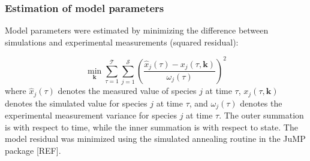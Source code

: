 \documentclass[10pt,twocolumn,twoside,final]{IEEEtran}
\begin{document}
\subsubsection*{Estimation of model parameters}
Model parameters were estimated by minimizing the difference between simulations and experimental measurements (squared residual):

\begin{equation}\label{eqn:objective-function}
	\min_{\mathbf{k}} \sum_{\tau=1}^{\mathcal{T}}\sum_{j=1}^{\mathcal{S}}\left(\frac{\hat{x}_{j}\left(\tau\right) - x_{j}\left(\tau,\mathbf{k}\right)}{\omega_{j}\left(\tau\right)}\right)^{2}
\end{equation}
where $\hat{x}_{j}\left(\tau\right)$ denotes the measured value of species $j$ at time $\tau$, $x_{j}\left(\tau,\mathbf{k}\right)$ denotes the simulated
value for species $j$ at time $\tau$, and $\omega_{j}\left(\tau\right)$ denotes the experimental measurement variance for species $j$ at time $\tau$.
The outer summation is with respect to time, while the inner summation is with respect to state. The model residual was minimized using the simulated annealing routine
in the JuMP package [REF].



\end{document}
